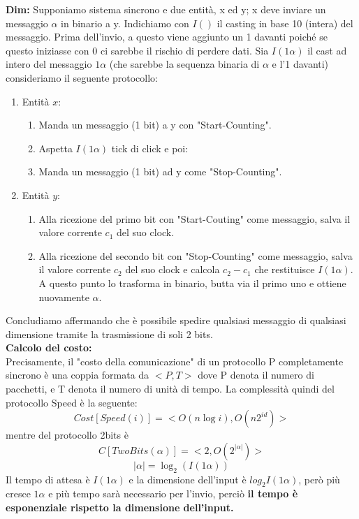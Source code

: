 \textbf{Dim:} Supponiamo sistema sincrono e due entità, x ed y; x deve inviare un messaggio $\alpha$ in binario a y. Indichiamo con $I()$ il casting in base 10 (intera) del messaggio. Prima dell'invio, a questo viene aggiunto un 1 davanti poiché se questo iniziasse con 0 ci sarebbe il rischio di perdere dati. Sia $I(1\alpha)$ il cast ad intero del messaggio $1\alpha$ (che sarebbe la sequenza binaria di $\alpha$ e l'1 davanti) consideriamo il seguente protocollo:
\begin{enumerate}
    \item Entità $x$:
    \begin{enumerate}
        \item Manda un messaggio (1 bit) a y con "Start-Counting".
        \item Aspetta $I(1\alpha)$ tick di click e poi:
        \item Manda un messaggio (1 bit) ad y come "Stop-Counting".
    \end{enumerate}
    \item Entità $y$:
    \begin{enumerate}
        \item Alla ricezione del primo bit con "Start-Couting" come messaggio, salva il valore corrente $c_1$ del suo clock.
        \item Alla ricezione del secondo bit con "Stop-Counting" come messaggio, salva il valore corrente $c_2$ del suo clock e calcola $c_2 - c_1$ che restituisce $I(1\alpha)$. A questo punto lo trasforma in binario, butta via il primo uno e ottiene nuovamente $\alpha$.
    \end{enumerate}
\end{enumerate}
Concludiamo affermando che è possibile spedire qualsiasi messaggio di qualsiasi dimensione tramite la trasmissione di soli 2 bits.\\
\textbf{Calcolo del costo:}\\
Precisamente, il "costo della comunicazione" di un protocollo P completamente sincrono è una coppia formata da $<P,T>$ dove P denota il numero di pacchetti, e T denota il numero di unità di tempo. La complessità quindi del protocollo Speed è la seguente:$$Cost[Speed(i)] = <O(n \log i), O(n 2^{id})>$$ mentre del protocollo 2bits è $$C[TwoBits(\alpha)] = <2, O(2^{|\alpha|})>$$ $$|\alpha|=\log_2(I(1\alpha))$$
Il tempo di attesa è $I(1\alpha)$ e la dimensione dell'input è $log_2 I(1\alpha)$, però più cresce $1\alpha$ e più tempo sarà necessario per l'invio, perciò \textbf{il tempo è esponenziale rispetto la dimensione dell'input.}
